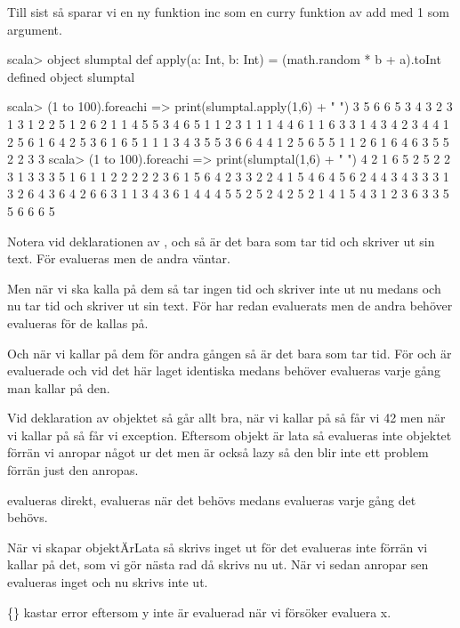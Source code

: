 Till sist så sparar vi en ny funktion inc som en curry funktion av add med 1 som argument.

\Subtask
\begin{REPL}
scala> object slumptal{ def apply(a: Int, b: Int) = (math.random * b + a).toInt }
defined object slumptal

scala> (1 to 100).foreach{i => print(slumptal.apply(1,6) + " ")}
3 5 6 6 5 3 4 3 2 3 1 3 1 2 2 5 1 2 6 2 1 1 4 5 5 3 4 6 5 1 1 2 3 1 1 1 4 4 6 1 1 6 3 3 1 4 3 4 2 3 4 4 1 2 5 6 1 6 4 2 5 3 6 1 6 5 1 1 1 3 4 3 5 5 3 6 6 4 4 1 2 5 6 5 5 1 1 2 6 1 6 4 6 3 5 5 2 2 3 3
scala> (1 to 100).foreach{i => print(slumptal(1,6) + " ")}
4 2 1 6 5 2 5 2 2 3 1 3 3 3 5 1 6 1 1 2 2 2 2 2 3 6 1 5 6 4 2 3 3 2 2 4 1 5 4 6 4 5 6 2 4 4 3 4 3 3 3 1 3 2 6 4 3 6 4 2 6 6 3 1 1 3 4 3 6 1 4 4 4 5 5 2 5 2 4 2 5 2 1 4 1 5 4 3 1 2 3 6 3 3 5 5 6 6 6 5

\end{REPL}

\Task

\Subtask Notera vid deklarationen av ,  och  så är det bara  som tar tid och skriver ut sin text. För  evalueras men de andra väntar.

Men när vi ska kalla på dem så tar  ingen tid och skriver inte ut nu medans  och  nu tar tid och skriver ut sin text. För  har redan evaluerats men de andra behöver evalueras för de kallas på.

Och när vi kallar på dem för andra gången så är det bara  som tar tid. För  och  är evaluerade och vid det här laget identiska medans  behöver evalueras varje gång man kallar på den.

Vid deklaration av objektet så går allt bra, när vi kallar på  så får vi 42 men när vi kallar på  så får vi exception. Eftersom objekt är lata så evalueras inte objektet förrän vi anropar något ur det men  är också lazy så den blir inte ett problem förrän just den anropas.

\Subtask
{} evalueras direkt,  evalueras när det behövs medans  evalueras varje gång det behövs.

\Subtask
När vi skapar objektÄrLata så skrivs inget ut för det evalueras inte förrän vi kallar på det, som vi gör nästa rad då skrivs nu ut. När vi sedan anropar sen evalueras inget och nu skrivs inte ut.

\{\} kastar error eftersom y inte är evaluerad när vi försöker evaluera x.


